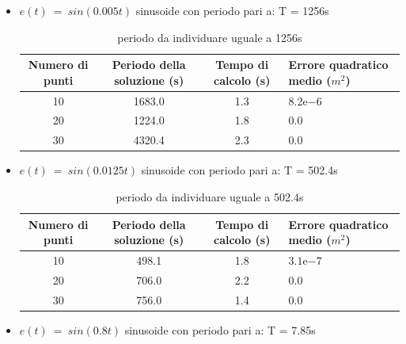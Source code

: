 \documentclass[a4paper,12pt]{report}
\newcommand{\expnumber}[2]{{#1}\mathrm{e}{#2}}
\begin{document}
\begin{itemize}
  \item $ e(t)~=~sin(0.005t)$ sinusoide con periodo pari a:
    T = 1256s
  \begin{table}[H]
    \caption{periodo da individuare uguale a 1256s}
    \label{tab:centro1_2}
    \begin{center}
      \begin{tabularx}{\textwidth}{SSSp{0.5\textwidth}}
        \toprule
        {Numero di punti} & {Periodo della soluzione (s)} & {Tempo di calcolo (s)} & {Errore quadratico \newline medio ($m^2$)}\\
        \midrule
        10 &  1683.0  & 1.3 & $\expnumber{8.2}{-6}$\\
        20 &  1224.0 & 1.8 & $0.0$\\
        30 &  4320.4 & 2.3 & $0.0$\\
        \bottomrule
      \end{tabularx}
    \end{center}
  \end{table}

  \item $ e(t)~=~sin(0.0125t)$ sinusoide con periodo pari a:
      T = 502.4s

    \begin{table}[H]
      \caption{periodo da individuare uguale a 502.4s}
      \label{tab:centro2_2}
      \begin{center}
        \begin{tabularx}{\textwidth}{SSSp{0.5\textwidth}}
          \toprule
          {Numero di punti} & {Periodo della soluzione (s)} & {Tempo di calcolo (s)} & {Errore quadratico \newline medio ($m^2$)}\\
          \midrule
          10 &  498.1 & 1.8 & $\expnumber{3.1}{-7}$\\
          20 &  706.0 & 2.2 & $0.0$\\
          30 &  756.0 & 1.4 & $0.0$\\
          \bottomrule
        \end{tabularx}
      \end{center}
    \end{table}
    \item $ e(t)~=~sin(0.8t)$ sinusoide con periodo pari a:
        T = 7.85s




\end{itemize}
\end{document}
